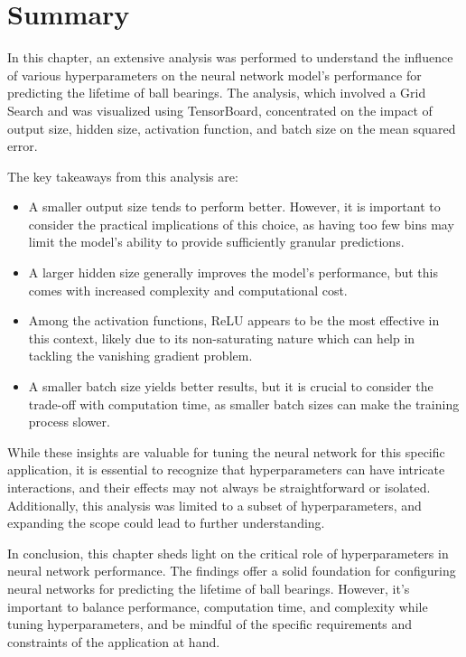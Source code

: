 \section{Summary}

In this chapter, an extensive analysis was performed to understand the influence of various hyperparameters on the neural network model's performance for predicting the lifetime of ball bearings. The analysis, which involved a Grid Search and was visualized using TensorBoard, concentrated on the impact of output size, hidden size, activation function, and batch size on the mean squared error.

The key takeaways from this analysis are:

\begin{itemize}
    \item A smaller output size tends to perform better. However, it is important to consider the practical implications of this choice, as having too few bins may limit the model’s ability to provide sufficiently granular predictions.
    
    \item A larger hidden size generally improves the model's performance, but this comes with increased complexity and computational cost.
    
    \item Among the activation functions, ReLU appears to be the most effective in this context, likely due to its non-saturating nature which can help in tackling the vanishing gradient problem.
    
    \item A smaller batch size yields better results, but it is crucial to consider the trade-off with computation time, as smaller batch sizes can make the training process slower.
\end{itemize}

While these insights are valuable for tuning the neural network for this specific application, it is essential to recognize that hyperparameters can have intricate interactions, and their effects may not always be straightforward or isolated. Additionally, this analysis was limited to a subset of hyperparameters, and expanding the scope could lead to further understanding.

In conclusion, this chapter sheds light on the critical role of hyperparameters in neural network performance. The findings offer a solid foundation for configuring neural networks for predicting the lifetime of ball bearings. However, it's important to balance performance, computation time, and complexity while tuning hyperparameters, and be mindful of the specific requirements and constraints of the application at hand.
